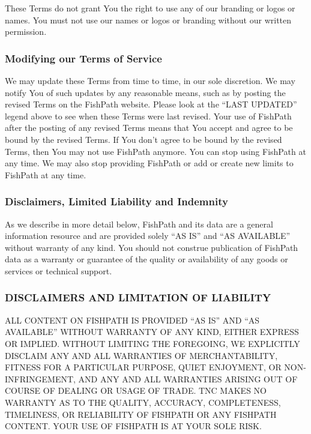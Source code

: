 \documentclass[11pt,]{book}
\begin{document}
These Terms do not grant You the right to use any of our branding or logos or names. You must not use our names or logos or branding without our written permission.

\hypertarget{modifying-our-terms-of-service}{%
\subsubsection*{Modifying our Terms of Service}\label{modifying-our-terms-of-service}}

We may update these Terms from time to time, in our sole discretion. We may notify You of such updates by any reasonable means, such as by posting the revised Terms on the FishPath website. Please look at the ``LAST UPDATED'' legend above to see when these Terms were last revised. Your use of FishPath after the posting of any revised Terms means that You accept and agree to be bound by the revised Terms. If You don't agree to be bound by the revised Terms, then You may not use FishPath anymore. You can stop using FishPath at any time. We may also stop providing FishPath or add or create new limits to FishPath at any time.

\hypertarget{disclaimers-limited-liability-and-indemnity}{%
\subsubsection*{Disclaimers, Limited Liability and Indemnity}\label{disclaimers-limited-liability-and-indemnity}}

As we describe in more detail below, FishPath and its data are a general information resource and are provided solely ``AS IS'' and ``AS AVAILABLE'' without warranty of any kind. You should not construe publication of FishPath data as a warranty or guarantee of the quality or availability of any goods or services or technical support.

\hypertarget{disclaimers-and-limitation-of-liability}{%
\subsubsection*{DISCLAIMERS AND LIMITATION OF LIABILITY}\label{disclaimers-and-limitation-of-liability}}

ALL CONTENT ON FISHPATH IS PROVIDED ``AS IS'' AND ``AS AVAILABLE'' WITHOUT WARRANTY OF ANY KIND, EITHER EXPRESS OR IMPLIED. WITHOUT LIMITING THE FOREGOING, WE EXPLICITLY DISCLAIM ANY AND ALL WARRANTIES OF MERCHANTABILITY, FITNESS FOR A PARTICULAR PURPOSE, QUIET ENJOYMENT, OR NON-INFRINGEMENT, AND ANY AND ALL WARRANTIES ARISING OUT OF COURSE OF DEALING OR USAGE OF TRADE. TNC MAKES NO WARRANTY AS TO THE QUALITY, ACCURACY, COMPLETENESS, TIMELINESS, OR RELIABILITY OF FISHPATH OR ANY FISHPATH CONTENT. YOUR USE OF FISHPATH IS AT YOUR SOLE RISK.
\end{document}
